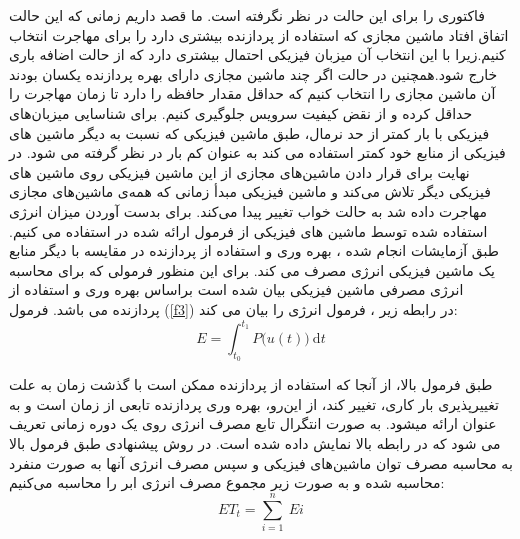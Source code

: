  فاکتوری را برای این حالت در نظر نگرفته است. ما قصد داریم زمانی که این حالت اتفاق افتاد ماشین مجازی که استفاده از پردازنده بیشتری دارد را برای مهاجرت انتخاب کنیم.زیرا با این انتخاب آن میزبان فیزیکی احتمال بیشتری دارد که از حالت اضافه باری خارج شود.همچنین در حالت
 اگر چند ماشین مجازی دارای بهره پردازنده یکسان بودند آن ماشین مجازی را انتخاب کنیم که حداقل مقدار حافظه را دارد تا زمان مهاجرت را حداقل کرده و از نقض کیفیت سرویس جلوگیری کنیم.
برای شناسایی میزبان‌های فیزیکی با بار کمتر از حد نرمال، طبق 
\cite{num15}
ماشین فیزیکی که نسبت به دیگر ماشین های فیزیکی از منابع خود کمتر استفاده می کند به عنوان کم بار در نظر گرفته می شود. در نهایت برای قرار دادن ماشین‌های مجازی از این ماشین فیزیکی روی ماشین ‌های فیزیکی دیگر تلاش می‌کند و ماشین فیزیکی مبدأ زمانی که همه‌ی ماشین‌های مجازی مهاجرت داده شد به حالت خواب تغییر پیدا می‌کند.
برای بدست آوردن میزان انرژی استفاده شده توسط ماشین های فیزیکی از  فرمول ارائه شده در  
\cite{num15}
استفاده می کنیم­. طبق آزمایشات انجام شده ، بهره وری و استفاده از پردازنده در مقایسه با دیگر منابع یک ماشین فیزیکی انرژی مصرف می کند. برای این منظور فرمولی که برای محاسبه انرژی مصرفی ماشین فیزیکی بیان شده است براساس بهره وری و استفاده از پردازنده می باشد. فرمول
(\ref{f3})
 در رابطه زیر ، فرمول انرژی را بیان می کند­:
\cite{num15}
\begin{equation}
E=\int_{t_0}^{t_1}P\Big(u(t)\Big)\:\mathrm{d}t
\label{f3}
\end{equation}
 
طبق فرمول بالا، از آنجا  که استفاده از پردازنده ممکن است با گذشت زمان به علت تغییرپذیری بار کاری­، تغییر کند­، از این‌رو، بهره وری پردازنده تابعی از زمان است و به عنوان 
ارائه می­شود­.
 به صورت انتگرال تابع مصرف انرژی روی یک دوره زمانی تعریف می شود که در رابطه بالا نمایش داده شده است. در روش پیشنهادی طبق فرمول بالا به محاسبه مصرف توان ماشین‌های فیزیکی و سپس مصرف انرژی آنها به صورت منفرد محاسبه شده و به صورت زیر مجموع مصرف انرژی ابر را محاسبه می‌کنیم:
\cite{num15}
\begin{equation}
ET_t = \sum_{i=1}^{n}\:Ei
\label{f4}
\end{equation}

